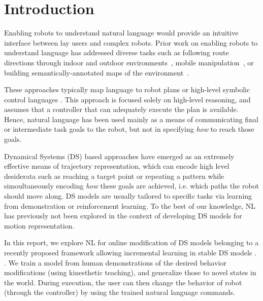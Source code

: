 \section{Introduction}
\label{secIntroduction}


Enabling robots to understand natural language would provide an intuitive interface between lay users and complex robots.
Prior work on enabling robots to understand language has addressed diverse tasks such as following route directions through indoor and outdoor environments~\cite{macmahon06, kollar10, matuszek12a, duvallet13, boularias15}, mobile manipulation~\cite{tellex11, howard14a}, or building semantically-annotated maps of the environment~\cite{walter13}.

These approaches typically map language to robot plans or high-level symbolic control languages . This approach is focused solely on high-level reasoning, and assumes that a controller that can adequately execute the plan is available. Hence, natural language has been used mainly as a means of communicating final or intermediate task goals to the robot, but not in specifying \emph{how} to reach those goals.

Dynamical Systems (DS) based approaches have emerged as an extremely effective means of trajectory representation, which can encode high level desiderata such as reaching a target point \cite{Khansari-Zadeh2011,Calinon2012} or repeating a pattern \cite{Buchli2006,Kronander2015} while simoultaneously encoding \emph{how} these goals are achieved, i.e. which paths the robot should move along.
 DS models are usually tailored to specific tasks via learning from demonstration or reinforcement learning.
 To the best of our knowledge, NL has previously not been explored in the context of developing DS models for motion representation.

In this report, we explore NL for online modification of DS models belonging to a recently proposed framework allowing incremental learning in stable DS models \cite{Kronander2015}. . 
We train a model from human demonstrations of the desired behavior modifications (using kinesthetic teaching), and generalize those to novel states in the world.
During execution, the user can then change the behavior of robot (through the controller) by using the trained natural language commands.


